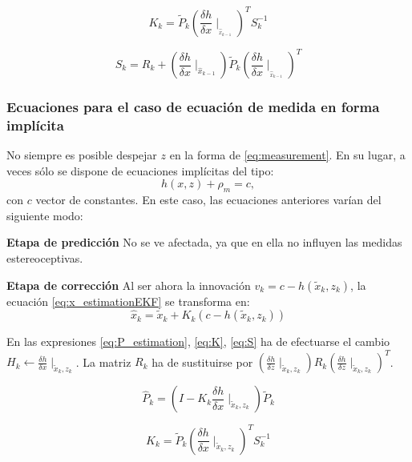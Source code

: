\begin{equation}\label{eq:KEKF}
    K_{k} = \tilde{P}_{k}(\frac{\delta h}{\delta x}\mid _{_{\hat{x}_{k-1}}})^{T}S_{k}^{-1}
\end{equation}

\begin{equation}\label{eq:SEKF}
    S_{k} = R_{k}+(\frac{\delta h}{\delta x}\mid _{\hat{x}_{k-1}})\tilde{P}_{k} (\frac{\delta h}{\delta x}\mid _{_{\hat{x}_{k-1}}})^{T}
\end{equation}

\subsubsection{Ecuaciones para el caso de ecuación de medida en forma implícita}

No siempre es posible despejar $z$ en la forma de \ref{eq:measurement}. En su lugar, a veces sólo se dispone de ecuaciones implícitas del tipo:
\begin{equation}\label{eq:implicit}
    h(x,z)+\rho_{m}=c,
\end{equation}
con $c$ vector de constantes.
En este caso, las ecuaciones anteriores varían del siguiente modo:


\textbf{Etapa de predicción}
No se ve afectada, ya que en ella no influyen las medidas estereoceptivas.


\textbf{Etapa de corrección}
Al ser ahora la innovación $v_{k}=c-h(\tilde{x}_{k},z_{k})$, la ecuación \ref{eq:x_estimationEKF} se transforma en:
\begin{equation}\label{eq:x_estimationIm}
    \hat{x}_{k} = \tilde{x}_{k}+K_{k}(c-h(\tilde{x}_{k},z_{k}))
\end{equation}

En las expresiones \ref{eq:P_estimation}, \ref{eq:K}, \ref{eq:S} ha de efectuarse el cambio $H_{k}\leftarrow \frac{\delta h}{\delta x}\mid_{\tilde{x}_{k},z_{k}}$. La matriz $R_{k}$ ha de sustituirse por $(\frac{\delta h}{\delta z} \mid _{\tilde{x}_{k},z_{k}}) R_{k} (\frac{\delta h}{\delta z} \mid _{\tilde{x}_{k},z_{k}})^{T}$.

 \begin{equation}\label{eq:P_estimationEKF_im}
    \hat{P}_{k} = (I-K_{k}\frac{\delta h}{\delta x}\mid_{\tilde{x}_{k},z_{k}})\tilde{P}_{k}
\end{equation}

\begin{equation}\label{eq:KEKF_im}
    K_{k} = \tilde{P}_{k}(\frac{\delta h}{\delta x}\mid_{\tilde{x}_{k},z_{k}})^{T}S_{k}^{-1}
\end{equation}

